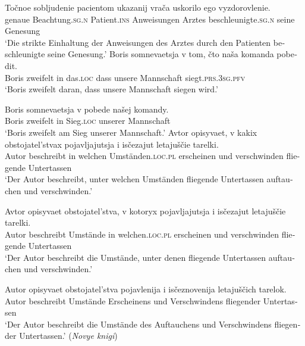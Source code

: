 \documentclass[output=paper]{langscibook}
\begin{document}
\begin{otherlanguage}{german}
\largerpage
    \ex \label{ex:zi83:1b}
    \gll Točnoe sobljudenie pacientom ukazanij vrača uskorilo ego vyzdorovlenie.\\
     genaue Beachtung.\textsc{sg}.\textsc{n}  Patient.\textsc{ins} Anweisungen Arztes beschleunigte.\textsc{sg}.\textsc{n} seine Genesung\\
       \glt ‘Die strikte Einhaltung der Anweisungen des Arztes durch den Patienten beschleunigte seine Genesung.’
    \z
\ex \label{ex:zi83:2}
    \ea \label{ex:zi83:2a}
    \gll Boris somnevaetsja v tom, čto naša komanda pobedit. \\
    Boris zweifelt in das.\textsc{loc} dass unsere Mannschaft siegt.\textsc{prs}.3\textsc{sg}.\textsc{pfv} \\
    \glt ‘Boris zweifelt daran, dass unsere Mannschaft siegen wird.’
    
    \ex \label{ex:zi83:2b}
    \gll Boris somnevaetsja v pobede našej komandy. \\
    Boris zweifelt in Sieg.\textsc{loc} unserer Mannschaft \\
    \glt ‘Boris zweifelt am Sieg unserer Mannschaft.’
    \z
\ex \label{ex:zi83:3}
    \ea \label{ex:zi83:3a}
    \gll Avtor opisyvaet, v kakix obstojatel’stvax pojavljajutsja i isčezajut letajuščie tarelki. \\ 
    Autor beschreibt in welchen Umständen.\textsc{loc}.\textsc{pl} erscheinen und verschwinden fliegende Untertassen \\
    \glt ‘Der Autor beschreibt, unter welchen Umständen fliegende Untertassen auftauchen und verschwinden.’
    
    \ex \label{ex:zi83:3b}
    \gll Avtor opisyvaet obstojatel’stva, v kotoryx pojavljajutsja i isčezajut letajuščie tarelki. \\
    Autor beschreibt Umstände in welchen.\textsc{loc}.\textsc{pl} erscheinen und verschwinden fliegende Untertassen\\
    \glt ‘Der Autor beschreibt die Umstände, unter denen fliegende Untertassen auftauchen und verschwinden.’
    
    \ex \label{ex:zi83:3c}
    \gll Autor opisyvaet obstojatel’stva pojavlenija i isčeznovenija letajuščich tarelok.  \\
     Autor beschreibt Umstände  Erscheinens und Verschwindens fliegender Untertassen \\
     \glt ‘Der Autor beschreibt die Umstände des Auftauchens und Verschwindens fliegender Untertassen.’ (\textit{Novye knigi})
    \z
\z


\end{otherlanguage}
\end{document}
